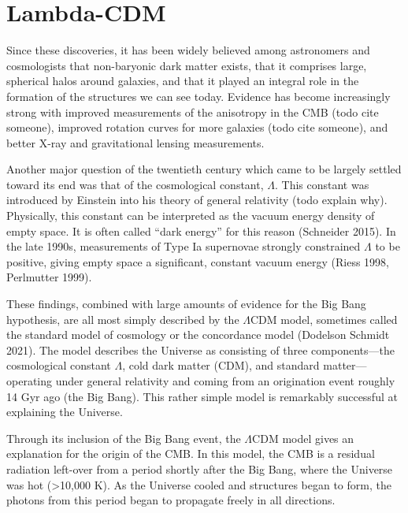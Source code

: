 \hypertarget{lambda-cdm-1}{%
\section{Lambda-CDM}\label{lambda-cdm-1}}

Since these discoveries, it has been widely believed among astronomers
and cosmologists that non-baryonic dark matter exists, that it comprises
large, spherical halos around galaxies, and that it played an integral
role in the formation of the structures we can see today. Evidence has
become increasingly strong with improved measurements of the anisotropy
in the CMB (todo cite someone), improved rotation curves for more
galaxies (todo cite someone), and better X-ray and gravitational lensing
measurements.

Another major question of the twentieth century which came to be largely
settled toward its end was that of the cosmological constant,
\(\Lambda\). This constant was introduced by Einstein into his theory of
general relativity (todo explain why). Physically, this constant can be
interpreted as the vacuum energy density of empty space. It is often
called ``dark energy'' for this reason (Schneider 2015). In the late
1990s, measurements of Type Ia supernovae strongly constrained
\(\Lambda\) to be positive, giving empty space a significant, constant
vacuum energy (Riess 1998, Perlmutter 1999).

These findings, combined with large amounts of evidence for the Big Bang
hypothesis, are all most simply described by the \(\Lambda\)CDM model,
sometimes called the standard model of cosmology or the concordance
model (Dodelson Schmidt 2021). The model describes the Universe as
consisting of three components---the cosmological constant \(\Lambda\),
cold dark matter (CDM), and standard matter---operating under general
relativity and coming from an origination event roughly 14 Gyr ago (the
Big Bang). This rather simple model is remarkably successful at
explaining the Universe.

Through its inclusion of the Big Bang event, the \(\Lambda\)CDM model
gives an explanation for the origin of the CMB. In this model, the CMB
is a residual radiation left-over from a period shortly after the Big
Bang, where the Universe was hot (\textgreater{}10,000 K). As the
Universe cooled and structures began to form, the photons from this
period began to propagate freely in all directions.

